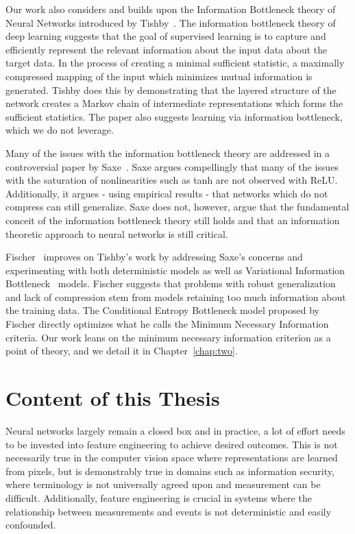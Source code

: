 Our work also considers and builds upon the Information Bottleneck theory of Neural Networks introduced by Tishby~\cite{tishby2015deep}.
The information bottleneck theory of deep learning suggests that the goal of supervised learning is to capture and efficiently represent the relevant information about the input data about the target data. 
In the process of creating a minimal sufficient statistic, a maximally compressed mapping of the input which minimizes mutual information is generated.
Tishby does this by demonstrating that the layered structure of the network creates a Markov chain of intermediate representations which forms the sufficient statistics.
The paper also suggests learning via information bottleneck, which we do not leverage.

Many of the issues with the information bottleneck theory are addressed in a controversial paper by Saxe~\cite{saxe2019information}.
Saxe argues compellingly that many of the issues with the saturation of nonlinearities such as tanh are not observed with ReLU.
Additionally, it argues - using empirical results - that networks which do not compress can still generalize. 
Saxe does not, however, argue that the fundamental conceit of the information bottleneck theory still holds and that an information theoretic approach to neural networks is still critical.

Fischer~\cite{fischer2020conditional} improves on Tishby's work by addressing Saxe's concerns and experimenting with both deterministic models as well as Variational Information Bottleneck~\cite{alemi2016deep} models. 
Fischer suggests that problems with robust generalization and lack of compression stem from models retaining too much information about the training data.
The Conditional Entropy Bottleneck model proposed by Fischer directly optimizes what he calls the Minimum Necessary Information criteria. 
Our work leans on the minimum necessary information criterion as a point of theory, and we detail it in Chapter~\ref{chap:two}.

\section{Content of this Thesis}
Neural networks largely remain a closed box and in practice, a lot of effort needs to be invested into feature engineering to achieve desired outcomes.
This is not necessarily true in the computer vision space where representations are learned from pixels, but is demonstrably true in domains such as information security, where terminology is not universally agreed upon and measurement can be difficult.
Additionally, feature engineering is crucial in systems where the relationship between measurements and events is not deterministic and easily confounded.

